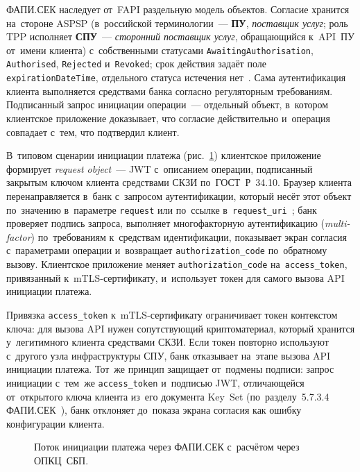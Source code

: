ФАПИ.СЕК наследует от~FAPI раздельную модель объектов. Согласие хранится
на~стороне ASPSP (в~российской
  терминологии~--- \textbf{ПУ}, \textit{поставщик услуг}; роль TPP исполняет
  \textbf{СПУ}~--- \textit{сторонний поставщик услуг}, обращающийся к~API~ПУ
от~имени клиента) с~собственными статусами \texttt{AwaitingAuthorisation},
\texttt{Authorised}, \texttt{Rejected} и~\texttt{Revoked}; срок действия
задаёт поле \texttt{expirationDateTime}, отдельного статуса истечения
нет~\cite{cbr-od-2892}. Сама аутентификация клиента выполняется
средствами банка согласно регуляторным требованиям. Подписанный запрос инициации
операции~--- отдельный объект, в~котором клиентское приложение доказывает, что
согласие действительно и~операция совпадает с~тем, что подтвердил клиент.

В~типовом сценарии инициации платежа (рис.~\ref{fig:fapi-sec-flow}) клиентское
приложение формирует \textit{request object}~--- JWT с~описанием операции, подписанный
закрытым ключом клиента средствами СКЗИ по~ГОСТ~Р~34.10.
Браузер клиента перенаправляется в~банк с~запросом аутентификации, который
несёт этот объект по~значению в~параметре \texttt{request} или по~ссылке
в~\texttt{request\_uri}~\cite{fapi-sec-2024}; банк
проверяет подпись запроса, выполняет многофакторную аутентификацию
(\textit{multi-factor}) по~требованиям к~средствам идентификации, показывает
экран согласия с~параметрами операции и~возвращает
\texttt{authorization\_code} по~обратному вызову.
Клиентское приложение меняет \texttt{authorization\_code}
на~\texttt{access\_token}, привязанный к~mTLS-сертификату,
и~использует токен для самого вызова API инициации платежа.

Привязка \texttt{access\_token} к~mTLS-сертификату ограничивает
токен контекстом ключа: для вызова API нужен сопутствующий криптоматериал,
который хранится у~легитимного клиента средствами СКЗИ. Если токен повторно
используют с~другого узла инфраструктуры СПУ, банк отказывает на~этапе вызова
API инициации платежа. Тот~же принцип защищает от~подмены подписи: запрос
инициации с~тем~же \texttt{access\_token} и~подписью JWT, отличающейся
от~открытого ключа клиента из~его документа Key~Set
(по~разделу~5.7.3.4 ФАПИ.СЕК~\cite{fapi-sec-2024}), банк отклоняет до~показа
экрана согласия как ошибку конфигурации клиента.

\begin{figure}[tbp]
  \centering
  \caption{Поток инициации платежа через ФАПИ.СЕК с~расчётом
  через ОПКЦ~СБП.}\label{fig:fapi-sec-flow}
\end{figure}

